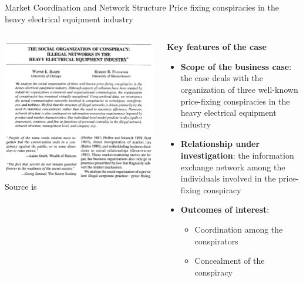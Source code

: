 \documentclass[notes, aspectratio=1610]{beamer}
\begin{document}
\begin{frame}{Market Coordination and Network Structure}
	{Price fixing conspiracies in the heavy electrical equipment industry}
	\centering
	\begin{columns}[c]
		\begin{column}{0.5\textwidth}
			\includegraphics[width=1\textwidth]{images/baker_faulkner.png}
			\small Source is~\cite{baker_faulkner_1993}
		\end{column}
		\begin{column}{0.5\textwidth}
			\begin{center}
			\textbf{Key features of the case}
			\end{center}
			\small
			\begin{itemize}
				\item 
				\textbf{Scope of the business case}: the 
				case deals with the organization of 
				three well-known price-fixing conspiracies in 
				the heavy electrical equipment industry 
				\item
				\textbf{Relationship under investigation}: the 
				information exchange network among the individuals 
				involved in the price-fixing conspiracy 
				\item
				\textbf{Outcomes of interest}:
				\begin{itemize}
					\item Coordination among the conspirators
					\item Concealment of the conspiracy
				\end{itemize}
			\end{itemize}
		\end{column}
	\end{columns}
\end{frame}
\end{document}
